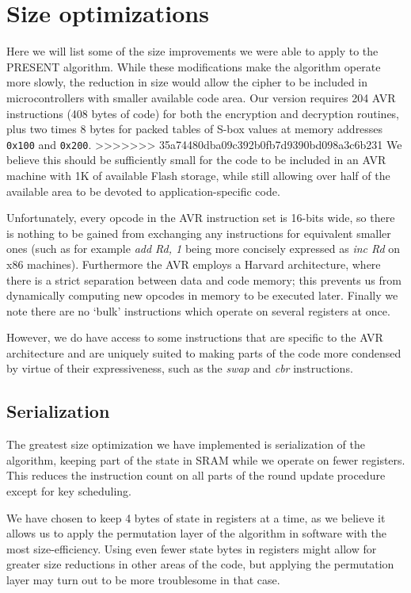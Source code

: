 \documentclass[11pt]{article}
\begin{document}
\section{Size optimizations}

Here we will list some of the size improvements we were able to apply to the PRESENT algorithm.
While these modifications make the algorithm operate more slowly, the reduction in size would allow the cipher to be included in microcontrollers with smaller available code area.
Our version requires 204 AVR instructions (408 bytes of code) for both the encryption and decryption routines, plus two times 8 bytes for packed tables of S-box values at memory addresses \texttt{0x100} and \texttt{0x200}.
>>>>>>> 35a74480dba09c392b0fb7d9390bd098a3c6b231
We believe this should be sufficiently small for the code to be included in an AVR machine with 1K of available Flash storage, while still allowing over half of the available area to be devoted to application-specific code.

Unfortunately, every opcode in the AVR instruction set is 16-bits wide, so there is nothing to be gained from exchanging any instructions for equivalent smaller ones (such as for example \textit{add Rd, 1} being more concisely expressed as \textit{inc Rd} on x86 machines).
Furthermore the AVR employs a Harvard architecture, where there is a strict separation between data and code memory; this prevents us from dynamically computing new opcodes in memory to be executed later.
Finally we note there are no `bulk' instructions which operate on several registers at once.

However, we do have access to some instructions that are specific to the AVR architecture and are uniquely suited to making parts of the code more condensed by virtue of their expressiveness, such as the \textit{swap} and \textit{cbr} instructions.

\subsection{Serialization}
The greatest size optimization we have implemented is serialization of the algorithm, keeping part of the state in SRAM while we operate on fewer registers.
This reduces the instruction count on all parts of the round update procedure except for key scheduling.

We have chosen to keep 4 bytes of state in registers at a time, as we believe it allows us to apply the permutation layer of the algorithm in software with the most size-efficiency.
Using even fewer state bytes in registers might allow for greater size reductions in other areas of the code, but applying the permutation layer may turn out to be more troublesome in that case.
\end{document}
